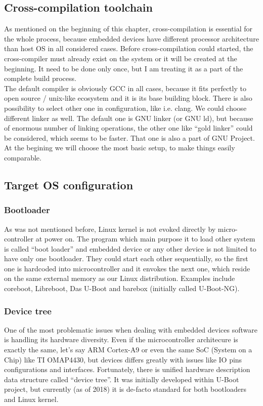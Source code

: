\documentclass[printmode]{mgr}
\begin{document}
\subsection{Cross-compilation toolchain}

As mentioned on the beginning of this chapter, cross-compilation is essential for the whole process, because embedded devices have different processor architecture than host OS in all considered cases. Before cross-compilation could started, the cross-compiler must already exist on the system or it will be created at the beginning. It need to be done only once, but I am treating it as a part of the complete build process. \\

The default compiler is obviously GCC in all cases, because it fits perfectly to open source / unix-like ecosystem and it is its base building block. There is also possibility to select other one in configuration, like i.e. clang. We could choose different linker as well. The default one is GNU linker (or GNU ld), but because of enormous number of linking operations, the other one like ``gold linker'' could be considered, which seems to be faster. That one is also a part of GNU Project. At the begining we will choose the most basic setup, to make things easily comparable. %

\subsection{Target OS configuration}

\subsubsection{Bootloader}
As was not mentioned before, Linux kernel is not evoked directly by micro-controller at power on. The program which main purpose it to load other system is called ``boot loader'' and embedded device or any other device is not limited to have only one bootloader. They could start each other sequentially, so the first one is hardcoded into microcontroller and it envokes the next one, which reside on the same external memory as our Linux distribution. Examples include coreboot, Libreboot, Das U-Boot and barebox (initially called U-Boot-NG).

\subsubsection{Device tree}
One of the most problematic issues when dealing with embedded devices software is handling its hardware diversity. Even if the microcontroller architecure is exactly the same, let's say ARM Cortex-A9 or even the same SoC (System on a Chip) like TI OMAP4430, but devices differs greatly with issues like IO pins configurations and interfaces. Fortunately, there is unified hardware description data structure called ``device tree''. It was initially developed within U-Boot project, but currently (as of 2018) it is de-facto standard for both bootloaders and Linux kernel.
\end{document}
